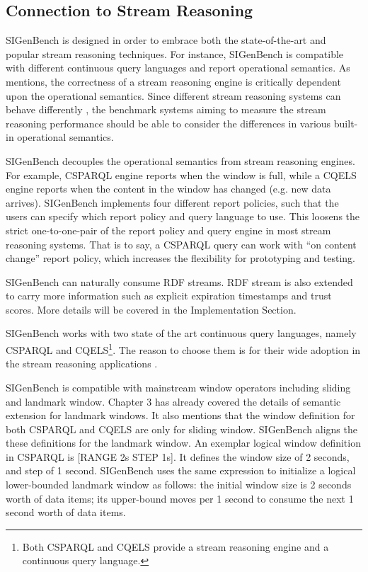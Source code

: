 \subsection{Connection to Stream Reasoning}
SIGenBench is designed in order to embrace both the state-of-the-art and popular stream reasoning techniques.
For instance, SIGenBench is compatible with different continuous query languages and report operational semantics. 
As \cite{dell2013correctness} mentions, the correctness of a stream reasoning engine is critically dependent upon the operational semantics. 
Since different stream reasoning systems can behave differently \cite{botan2010secret}, the benchmark systems aiming to measure the stream reasoning performance should be able to consider the differences in various built-in operational semantics.

SIGenBench decouples the operational semantics from stream reasoning engines.
For example, CSPARQL engine reports when the window is full, while a CQELS engine reports when the content in the window has changed (e.g. new data arrives). 
SIGenBench implements four different report policies, such that the users can specify which report policy and query language to use.
This loosens the strict one-to-one-pair of the report policy and query engine in most stream reasoning systems. 
That is to say, a CSPARQL query can work with ``on content change'' report policy, which increases the flexibility for prototyping and testing.

SIGenBench can naturally consume RDF streams.
RDF stream is also extended to carry more information such as explicit expiration timestamps and trust scores.
More details will be covered in the Implementation Section. 

SIGenBench works with two state of the art continuous query languages, namely CSPARQL and CQELS\footnote{Both CSPARQL and CQELS provide a stream reasoning engine and a continuous query language.}.
The reason to choose them is for their wide adoption in the stream reasoning applications \cite{dao2015towards} \cite{kolchin2014web} \cite{dejonghec} \cite{okure2013querying}.

SIGenBench is compatible with mainstream window operators including sliding and landmark window.
Chapter 3 has already covered the details of semantic extension for landmark windows.
It also mentions that the window definition for both CSPARQL and CQELS are only for sliding window.
SIGenBench aligns the these definitions for the landmark window. 
An exemplar logical window definition in CSPARQL is [RANGE 2s STEP 1s].
It defines the window size of 2 seconds, and step of 1 second. 
SIGenBench uses the same expression to initialize a logical lower-bounded landmark window as follows: 
the initial window size is 2 seconds worth of data items; its upper-bound moves per 1 second to consume the next 1 second worth of data items. 
%
